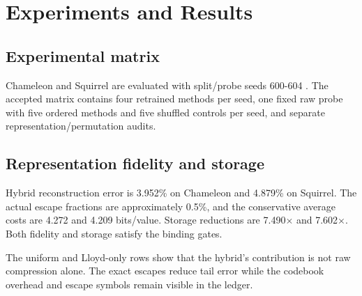 \documentclass{article}
\begin{document}
\section{Experiments and Results}


\subsection{Experimental matrix}


Chameleon and Squirrel are evaluated with split/probe seeds 600-604 \cite{pei2020geomgnn,platonov2023heterophily}. The accepted matrix contains four retrained methods per seed, one fixed raw probe with five ordered methods and five shuffled controls per seed, and separate representation/permutation audits.

\begin{table}[ht]
\centering
\caption{Methods, controls and exact accounting.}
\end{table}

\subsection{Representation fidelity and storage}


Hybrid reconstruction error is 3.952\% on Chameleon and 4.879\% on Squirrel. The actual escape fractions are approximately 0.5\%, and the conservative average costs are 4.272 and 4.209 bits/value. Storage reductions are 7.490$\times$ and 7.602$\times$. Both fidelity and storage satisfy the binding gates.

The uniform and Lloyd-only rows show that the hybrid's contribution is not raw compression alone. The exact escapes reduce tail error while the codebook overhead and escape symbols remain visible in the ledger.
\end{document}
